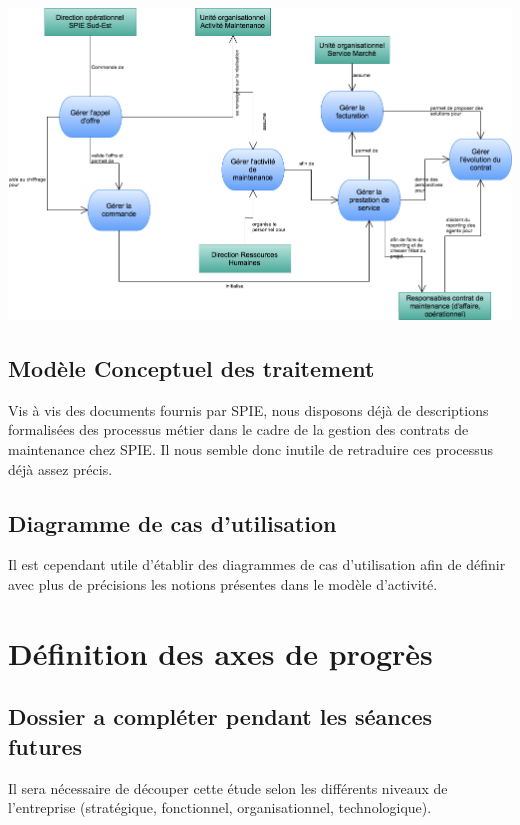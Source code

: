 \begin {center}
\includegraphics[width=\textwidth]{png/DiagrammeModeleActivite.png}
\end {center}

\subsection{Modèle Conceptuel des traitement} 
Vis à vis des documents fournis par SPIE, nous disposons déjà de descriptions formalisées des processus métier dans le cadre de la gestion des contrats de maintenance chez SPIE. Il nous semble donc inutile de retraduire ces processus déjà assez précis.

\subsection{Diagramme de cas d'utilisation}
Il est cependant utile d'établir des diagrammes de cas d'utilisation afin de définir avec plus de précisions les notions présentes dans le modèle d'activité.




\section{Définition des axes de progrès}





\subsection{Dossier a compléter pendant les séances futures}

Il sera nécessaire de découper cette étude selon les différents niveaux de l’entreprise (stratégique, fonctionnel, organisationnel, technologique).

